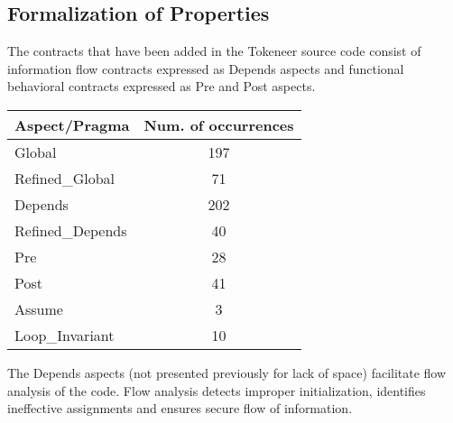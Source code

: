 \documentclass[10pt,a4paper,twocolumn]{article}
\newcommand{\oldspark}{SPARK~2005\xspace}
\begin{document}




\subsection{Formalization of Properties}

The contracts that have been added in the Tokeneer source code consist
of information flow contracts expressed as Depends aspects and
functional behavioral contracts expressed as Pre and Post aspects.

\begin{tabular}{|l|c|}
\hline
{\bf Aspect/Pragma}       & {\bf Num. of occurrences}  \\
\hline
Global              & 197 \\
\hline
Refined\_Global     & 71 \\
\hline
Depends             & 202 \\
\hline
Refined\_Depends    & 40 \\
\hline
Pre                 & 28 \\
\hline
Post                & 41 \\
\hline
Assume              & 3 \\
\hline
Loop\_Invariant     & 10 \\
\hline
\end{tabular}

The Depends aspects (not presented previously for lack of space)
facilitate flow analysis of the code. Flow analysis detects improper
initialization, identifies ineffective assignments and ensures secure
flow of information.
\end{document}
